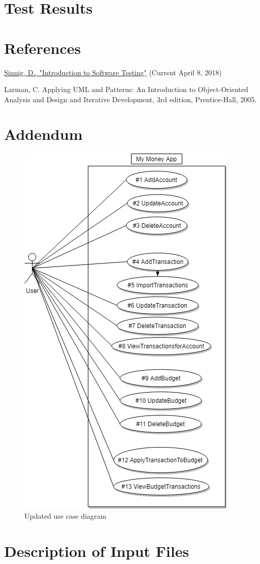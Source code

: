 \documentclass[12pt]{article}
\begin{document}
\section{Test Results}

\section{References}
\href{https://users.encs.concordia.ca/~gregb/home/PDF/comp354-testing-intro.pdf}{Sinnig, D., "Introduction to Software Testing"} (Current April 8, 2018)

Larman, C. Applying UML and Patterns: An Introduction to Object-Oriented Analysis and Design and Iterative Development, 3rd edition, Prentice-Hall, 2005.

\section{Addendum}

\begin{figure}[H]
\centering
\caption{Updated use case diagram}
\includegraphics[scale=0.5]{Diagrams/UML/SOEN.png}
\end{figure}

\section{Description of Input Files}
\end{document}
